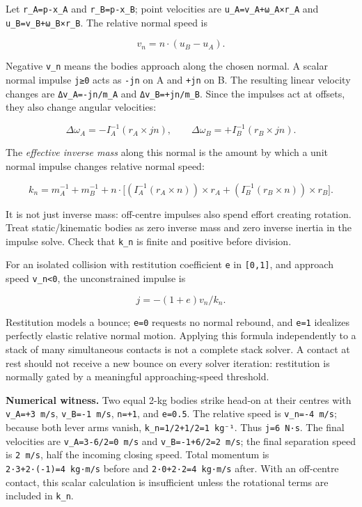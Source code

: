 Let \texttt{r\_A=p-x\_A} and \texttt{r\_B=p-x\_B}; point velocities are \texttt{u\_A=v\_A+ω\_A×r\_A} and \texttt{u\_B=v\_B+ω\_B×r\_B}. The relative normal speed is

\[
v_n=n\cdot(u_B-u_A).
\]

Negative \texttt{v\_n} means the bodies approach along the chosen normal. A scalar normal impulse \texttt{j≥0} acts as \texttt{-jn} on A and \texttt{+jn} on B. The resulting linear velocity changes are \texttt{Δv\_A=-jn/m\_A} and \texttt{Δv\_B=+jn/m\_B}. Since the impulses act at offsets, they also change angular velocities:

\[
\Delta\omega_A=-I_A^{-1}(r_A\times jn),\qquad
\Delta\omega_B=+I_B^{-1}(r_B\times jn).
\]

The \emph{effective inverse mass} along this normal is the amount by which a unit normal impulse changes relative normal speed:

\[
k_n=m_A^{-1}+m_B^{-1}
+n\cdot\Big[
(I_A^{-1}(r_A\times n))\times r_A
+(I_B^{-1}(r_B\times n))\times r_B
\Big].
\]

It is not just inverse mass: off-centre impulses also spend effort creating rotation. Treat static/kinematic bodies as zero inverse mass and zero inverse inertia in the impulse solve. Check that \texttt{k\_n} is finite and positive before division.

For an isolated collision with restitution coefficient \texttt{e} in \texttt{{[}0,1{]}}, and approach speed \texttt{v\_n\textless{}0}, the unconstrained impulse is

\[
j=-(1+e)v_n/k_n.
\]

Restitution models a bounce; \texttt{e=0} requests no normal rebound, and \texttt{e=1} idealizes perfectly elastic relative normal motion. Applying this formula independently to a stack of many simultaneous contacts is not a complete stack solver. A contact at rest should not receive a new bounce on every solver iteration: restitution is normally gated by a meaningful approaching-speed threshold.

\textbf{Numerical witness.} Two equal 2-kg bodies strike head-on at their centres with \texttt{v\_A=+3\ m/s}, \texttt{v\_B=-1\ m/s}, \texttt{n=+1}, and \texttt{e=0.5}. The relative speed is \texttt{v\_n=-4\ m/s}; because both lever arms vanish, \texttt{k\_n=1/2+1/2=1\ kg⁻¹}. Thus \texttt{j=6\ N·s}. The final velocities are \texttt{v\textquotesingle{}\_A=3-6/2=0\ m/s} and \texttt{v\textquotesingle{}\_B=-1+6/2=2\ m/s}; the final separation speed is \texttt{2\ m/s}, half the incoming closing speed. Total momentum is \texttt{2·3+2·(-1)=4\ kg·m/s} before and \texttt{2·0+2·2=4\ kg·m/s} after. With an off-centre contact, this scalar calculation is insufficient unless the rotational terms are included in \texttt{k\_n}.

